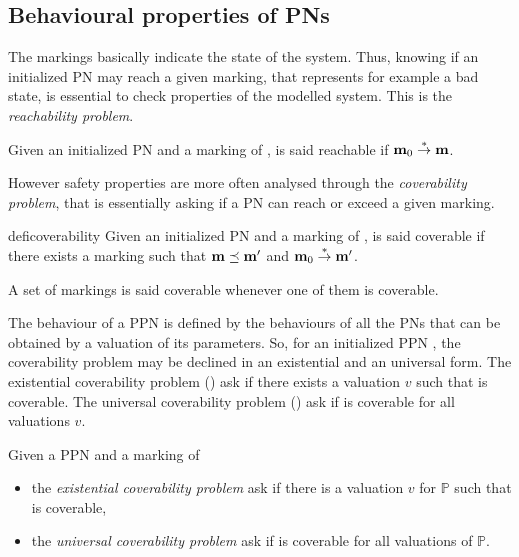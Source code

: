 \subsection{Behavioural properties of \acp{PN}}

The markings basically indicate the state of the system. Thus, knowing if an initialized \ac{PN} may reach a given marking, that represents for example a bad state, is essential to check properties of the modelled system. This is the \emph{reachability problem}.

\begin{defi}[Reachability]
  Given an initialized \ac{PN} \NPTm and a marking \marq of \tupleN, \marq is said reachable if $\mathbf{m}_0 \stackrel{*}{\to} \mathbf{m}$.
\end{defi}

However safety properties are more often analysed through the \emph{coverability problem}, that is essentially asking if a \ac{PN} can reach or exceed a given marking.

\begin{restatable}[Coverability]{defi}{coverability}
  Given an initialized \ac{PN} \NPTm and a marking \marq of \tupleN, \marq is said coverable if there exists a marking \marqp such that $\mathbf{m} \preceq \mathbf{m'}$ and $\mathbf{m}_0 \stackrel{*}{\to} \mathbf{m'}$.

  A set of markings is said coverable whenever one of them is coverable.
\end{restatable}

The behaviour of a \ac{PPN} is defined by the behaviours of all the \acp{PN} that can be obtained by a valuation of its parameters.
So, for an initialized \ac{PPN} \tupleS, the coverability problem may be declined in an existential and an universal form.
The existential coverability problem (\Ecov) ask if there exists a valuation $v$ such that \marq is coverable.
The universal coverability problem (\Ucov) ask if \marq is coverable for all valuations $v$.

\begin{defi}
  Given a \ac{PPN} \SPTP and a marking \marq of \tupleS
  \begin{itemize}
    \item the \emph{existential coverability problem} ask if there is a valuation $v$ for $\mathbb{P}$ such that \marq is coverable,
    \item the \emph{universal   coverability problem} ask if \marq is coverable for all valuations of $\mathbb{P}$.
  \end{itemize}
\end{defi}


